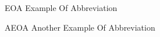 \begin{abbreviations}
\item[EOA] Example Of Abbreviation
\item[AEOA] Another Example Of Abbreviation
\end{abbreviations}

